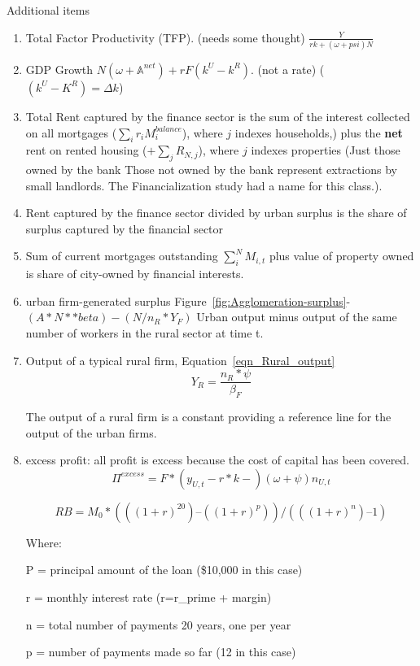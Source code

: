  Additional items 
\begin{enumerate}  
    \item Total Factor Productivity (TFP). (needs some thought) $\frac{Y}{rk+(\omega+psi)N}$
    
    \item GDP Growth $N(\omega +\mathbb{A}^{net}) + r F(k^U-k^R)$. (not a rate) ($(k^U-K^R)=\Delta k$)

\item Total Rent captured by the finance sector is the sum of the interest collected on all mortgages ($\sum_i r_iM_i^{balance}$), where $j$ indexes households,) plus the \textbf{net} rent on rented housing ($+ \sum_j R_{N, j}$), where $j$ indexes properties (Just those owned by the bank Those not owned by the bank represent extractions by small landlords. The Financialization study had a name for this class.).

\item Rent captured by the finance sector divided by urban surplus is the share of surplus captured by the financial sector


 \item  Sum of current mortgages outstanding $\sum_i^N M_{i,t}$ plus value of property owned is share of city-owned by financial interests.

\item urban firm-generated surplus Figure~\ref{fig:Agglomeration-surplus}- $(A * N**beta) - (N/n_R * Y_F)$ %
Urban output minus output of the same number of workers in the rural sector at time t.

\item Output of a  typical rural firm, Equation~\ref{eqn_Rural_output} 
\[Y_R=\frac{n_R*\psi}{\beta_F}\]

The output of a rural firm is a constant  providing a reference line for the output of the urban firms. %

  \item excess profit: all profit is excess because the cost of capital has been covered.
    \[\Pi^{excess}=F*(y_{U,t} - r*k -)(\omega+\psi)n_{U, t}\]

 \[RB = M_0 * (((1 + r)^20) – ((1 + r)^p)) / (((1 + r)^n) – 1)\]

Where:

    P = principal amount of the loan (\$10,000 in this case)
    
    r = monthly interest rate (r=r\_prime + margin)
    
    n = total number of payments 20 years, one per year
    
    p = number of payments made so far (12 in this case)   

\end{enumerate}



